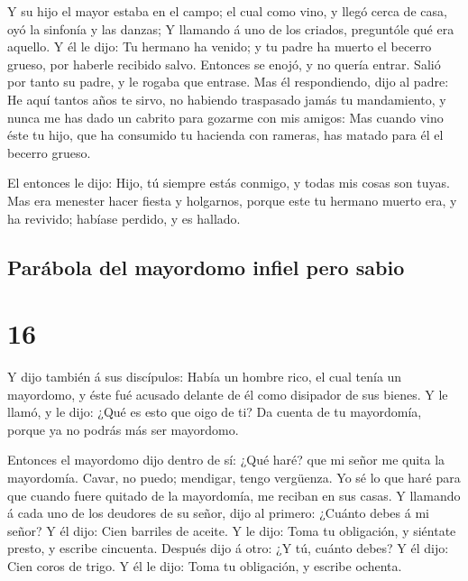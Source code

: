  Y su hijo el mayor estaba en el campo; el cual como
vino, y llegó cerca de casa, oyó la sinfonía y las danzas;
 Y llamando á uno de los criados, preguntóle qué era
aquello.  Y él le dijo: Tu hermano ha venido; y tu padre
ha muerto el becerro grueso, por haberle recibido salvo. 
Entonces se enojó, y no quería entrar. Salió por tanto su padre, y le
rogaba que entrase.  Mas él respondiendo, dijo al padre:
He aquí tantos años te sirvo, no habiendo traspasado jamás tu
mandamiento, y nunca me has dado un cabrito para gozarme con mis amigos:
 Mas cuando vino éste tu hijo, que ha consumido tu
hacienda con rameras, has matado para él el becerro grueso.

 El entonces le dijo: Hijo, tú siempre estás conmigo, y
todas mis cosas son tuyas.  Mas era menester hacer fiesta
y holgarnos, porque este tu hermano muerto era, y ha revivido; habíase
perdido, y es hallado.

\hypertarget{paruxe1bola-del-mayordomo-infiel-pero-sabio}{%
\subsection{Parábola del mayordomo infiel pero
sabio}\label{paruxe1bola-del-mayordomo-infiel-pero-sabio}}

\hypertarget{section-15}{%
\section{16}\label{section-15}}

 Y dijo también á sus discípulos: Había un hombre rico, el
cual tenía un mayordomo, y éste fué acusado delante de él como disipador
de sus bienes.  Y le llamó, y le dijo: ¿Qué es esto que
oigo de ti? Da cuenta de tu mayordomía, porque ya no podrás más ser
mayordomo.

 Entonces el mayordomo dijo dentro de sí: ¿Qué haré? que
mi señor me quita la mayordomía. Cavar, no puedo; mendigar, tengo
vergüenza.  Yo sé lo que haré para que cuando fuere
quitado de la mayordomía, me reciban en sus casas.  Y
llamando á cada uno de los deudores de su señor, dijo al primero:
¿Cuánto debes á mi señor?  Y él dijo: Cien barriles de
aceite. Y le dijo: Toma tu obligación, y siéntate presto, y escribe
cincuenta.  Después dijo á otro: ¿Y tú, cuánto debes? Y él
dijo: Cien coros de trigo. Y él le dijo: Toma tu obligación, y escribe
ochenta.

